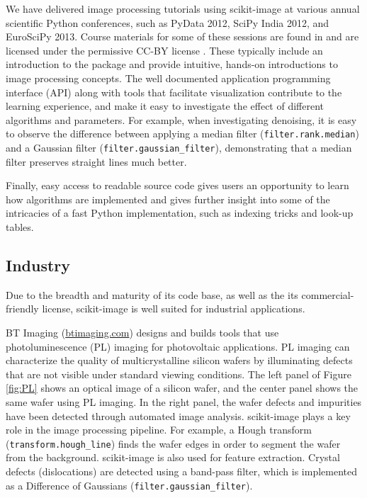 \documentclass[fleqn,12pt]{wlpeerj}
\begin{document}
We have delivered image processing tutorials using scikit-image at various annual scientific Python conferences, such as PyData 2012, SciPy India 2012, and EuroSciPy 2013. Course materials for some of these sessions are found in \cite{scipylecturenotes} and are licensed under the permissive CC-BY license \citep{cc-by}. These typically include an introduction to the package and provide intuitive, hands-on introductions to image processing concepts. The well documented application programming interface (API) along with tools that facilitate visualization contribute to the learning experience, and make it easy to investigate the effect of different algorithms and parameters. For example, when investigating denoising, it is easy to observe the difference between applying a median filter (\texttt{filter.rank.median}) and a Gaussian filter (\texttt{filter.gaussian\_filter}), demonstrating that a median filter preserves straight lines much better.

Finally, easy access to readable source code gives users an opportunity to learn how algorithms are implemented and gives further insight into some of the intricacies of a fast Python implementation, such as indexing tricks and look-up tables.


\subsection*{Industry}
\label{industry}

Due to the breadth and maturity of its code base, as well as the its commercial-friendly license, scikit-image is well suited for industrial applications.

BT Imaging (\url{btimaging.com}) designs and builds tools that use photoluminescence (PL) imaging for photovoltaic applications. PL imaging can characterize the quality of multicrystalline silicon wafers by illuminating defects that are not visible under standard viewing conditions. The left panel of Figure \ref{fig:PL} shows an optical image of a silicon wafer, and the center panel shows the same wafer using PL imaging. In the right panel, the wafer defects and impurities have been detected through automated image analysis. scikit-image plays a key role in the image processing pipeline. For example, a Hough transform (\texttt{transform.hough\_line}) finds the wafer edges in order to segment the wafer from the background. scikit-image is also used for feature extraction. Crystal defects (dislocations) are detected using a band-pass filter, which is implemented as a Difference of Gaussians (\texttt{filter.gaussian\_filter}).
\end{document}
